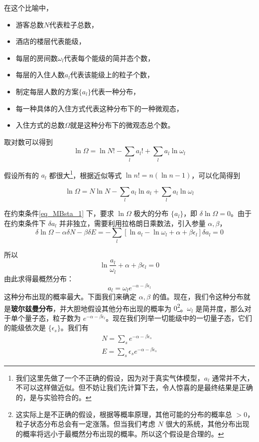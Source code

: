 \begin{example}{}
在这个比喻中，
\begin{itemize}
\item 游客总数$N$代表粒子总数，
\item 酒店的楼层代表能级，
\item 每层的房间数$\omega_l$代表每个能级的简并态个数，
\item 每层的入住人数$a_l$代表该能级上的粒子个数，
\item 制定每层人数的方案$\{a_l\}$代表一种分布，
\item 每一种具体的入住方式代表这种分布下的一种微观态，
\item 入住方式的总数$\Omega$就是这种分布下的微观态总个数。
\end{itemize}
\end{example}

取对数可以得到
\begin{equation}
\ln \Omega=\ln N!-\sum_{l}a_l!+\sum_l a_l\ln \omega_l
\end{equation}

假设所有的 $a_l$ 都很大\footnote{我们这里先做了一个不正确的假设，因为对于真实气体模型，$a_l$ 通常并不大，不可以这样做近似。但不妨让我们先计算下去，令人惊喜的是最终结果是正确的，是与实验符合的。}，根据近似等式 $\ln n! = n(\ln n-1)$，可以化简得到

\begin{equation}\label{eq_MBsta_6}
\ln \Omega=N\ln N-\sum_l a_l\ln a_l+\sum_l a_l\ln \omega_l
\end{equation}

在约束条件\autoref{eq_MBsta_1} 下，要求 $\ln \Omega$ 极大的分布 $\{a_l\}$，即 $\delta \ln \Omega =0$。由于在约束条件下 $\delta a_l$ 并非独立，需要利用拉格朗日乘数法，引入参量 $\alpha,\beta$，
\begin{equation}\label{eq_MBsta_7}
\delta \ln \Omega -\alpha \delta N-\beta \delta E=-\sum_l [\ln a_l-\ln \omega_l+\alpha +\beta\epsilon_l]\delta a_l=0
\end{equation}

所以
\begin{equation}
\ln \frac{a_l}{\omega_l}+\alpha+\beta\epsilon_l = 0
\end{equation}
由此求得最概然分布：
\begin{equation}\label{eq_MBsta_5}
a_l=\omega_l e^{-\alpha -\beta \epsilon_l}
\end{equation}
这种分布出现的概率最大。下面我们来确定 $\alpha,\beta$ 的值。现在，我们令这种分布就是\textbf{玻尔兹曼分布}，并大胆地假设其他分布出现的概率为 $0$\footnote{这实际上是不正确的假设，根据等概率原理，其他可能的分布的概率总 $>0$，粒子状态分布总会有一定涨落。但当我们考虑 $N$ 很大的系统，其他分布出现的概率将远小于最概然分布出现的概率。所以这个假设是合理的。}。$\omega_l$ 是简并度，那么对于单个量子态，粒子数为 $e^{-\alpha-\beta \epsilon_l}$。现在我们列举一切能级中的一切量子态，它们的能级依次是 $\{\epsilon_s\}$。我们有
\begin{equation}\label{eq_MBsta_2}
\begin{aligned}
N=\sum_s e^{-\alpha-\beta \epsilon_s}\\
E=\sum_s \epsilon_s e^{-\alpha-\beta \epsilon_s}
\end{aligned}
\end{equation}
